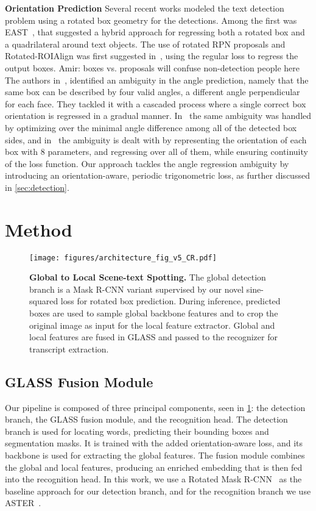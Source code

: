 \documentclass[runningheads]{llncs}
\newcommand{\colornote}[3]{{\color{#1}\small\textsf{#2:  #3}\normalfont}}
\newcommand{\colornote}[3]{}
\newcommand {\amir}[1]{\colornote{blue}{Amir}{#1}}
\begin{document}
\noindent \textbf{Orientation Prediction}
Several recent works modeled the text detection problem using a rotated box geometry for the detections.
Among the first was EAST~\cite{zhou2017east}, that suggested a hybrid approach for regressing both a rotated box and a quadrilateral around text objects.
The use of rotated RPN proposals and Rotated-ROIAlign was first suggested in~\cite{ma2018arbitrary}, using the regular  loss to regress the output boxes. \amir{boxes vs. proposals will confuse non-detection people here}
The authors in~\cite{zhu2019rotated}, identified an ambiguity in the angle prediction, namely that the same box can be described by four valid angles, a different angle perpendicular for each face. 
They tackled it with a cascaded process where a single correct box orientation is regressed in a gradual manner. 
In~\cite{lee2021rotated} the same ambiguity was handled by optimizing over the minimal angle difference among all of the detected box sides, and in~\cite{qian2021learning} the ambiguity is dealt with by representing the orientation of each box with 8 parameters, and regressing over all of them, while ensuring continuity of the loss function.
Our approach tackles the angle regression ambiguity by introducing an orientation-aware, periodic trigonometric loss, as further discussed in \cref{sec:detection}.



 
\section{Method}
\label{sec:method}
\begin{figure}[t]
 \centering
  \texttt{[image: figures/architecture\_fig\_v5\_CR.pdf]}
  \caption{\textbf{Global to Local Scene-text Spotting.} The global detection branch is a Mask R-CNN variant supervised by our novel sine-squared loss for rotated box prediction. During inference, predicted boxes are used to sample global backbone features and to crop the original image as input for the local feature extractor. Global and local features are fused in GLASS and passed to the recognizer for transcript extraction.}
  \label{fig:framework}
\end{figure}
\subsection{GLASS Fusion Module}
\label{sec:GLASS}
Our pipeline is composed of three principal components, seen in \cref{fig:framework}: the detection branch, the GLASS fusion module, and the recognition head.
The detection branch is used for locating words,  predicting their bounding boxes and segmentation masks.
It is trained with the added orientation-aware loss, and its backbone is used for extracting the global features.
The fusion module combines the global and local features, producing an enriched embedding that is then fed into the recognition head.
In this work, we use a Rotated Mask R-CNN~\cite{he2017mask,ma2018arbitrary} as the baseline approach for our detection branch, and for the recognition branch we use ASTER~\cite{shi2018aster}.
\end{document}
